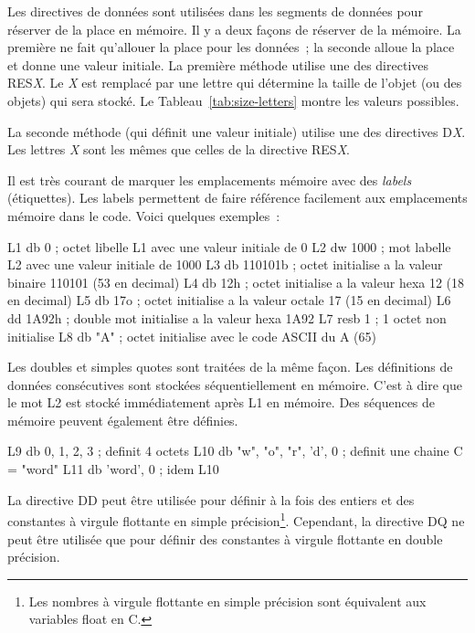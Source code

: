 Les directives de données sont utilisées dans les segments de données
pour réserver de la place en mémoire. Il y a deux façons de réserver de la
mémoire. La première ne fait qu'allouer la place pour les données~; la seconde
alloue la place et donne une valeur initiale. La première méthode utilise une
des directives {\code RES{\em X}}. Le {\em X} est
remplacé par une lettre qui détermine la taille de l'objet (ou des objets) qui
sera stocké. Le Tableau~\ref{tab:size-letters} montre les valeurs possibles.

La seconde méthode (qui définit une valeur initiale) utilise une des directives
{\code D{\em X}}. Les lettres {\em X} sont les mêmes
que celles de la directive {\code RES{\em X}}.

Il est très courant de marquer les emplacements mémoire avec des \emph{labels}
(étiquettes). Les labels permettent de faire référence facilement aux emplacements
mémoire dans le code. Voici quelques exemples~:
\begin{AsmCodeListing}[frame=none, numbers=none]
L1    db     0        ; octet libelle L1 avec une valeur initiale de 0
L2    dw     1000     ; mot labelle L2 avec une valeur initiale de 1000
L3    db     110101b  ; octet initialise a la valeur binaire 110101 (53 en decimal)
L4    db     12h      ; octet initialise a la valeur hexa 12 (18 en decimal)
L5    db     17o      ; octet initialise a la valeur octale 17 (15 en decimal)
L6    dd     1A92h    ; double mot initialise a la valeur hexa 1A92
L7    resb   1        ; 1 octet non initialise
L8    db     "A"      ; octet initialise avec le code ASCII du A (65)
\end{AsmCodeListing}

Les doubles et simples quotes sont traitées de la même façon. Les définitions
de données consécutives sont stockées séquentiellement en mémoire. C'est à dire
que le mot L2 est stocké immédiatement après L1 en mémoire. Des séquences de
mémoire peuvent également être définies.
\begin{AsmCodeListing}[frame=none, numbers=none]
L9    db     0, 1, 2, 3              ; definit 4 octets
L10   db     "w", "o", "r", 'd', 0   ; definit une chaine C = "word"
L11   db     'word', 0               ; idem L10
\end{AsmCodeListing}

La directive {\code DD} peut être utilisée pour définir
à la fois des entiers et des constantes à virgule flottante en simple
précision\footnote{Les nombres à virgule flottante en simple précision sont
équivalent aux variables {\code float} en C.}.
Cependant, la directive {\code DQ} ne peut être
utilisée que pour définir des constantes à virgule flottante en double
précision.

